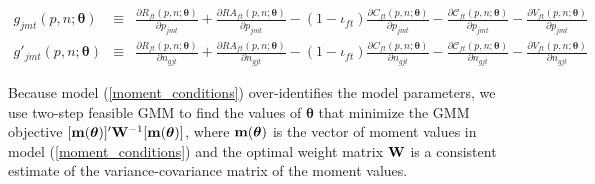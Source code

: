 \documentclass[12pt]{article}
\begin{document}
	\vspace{-0.4in}
	\begin{footnotesize}
	\begin{eqnarray*}
	g_{jmt}(\textit{p},\textit{n};\boldsymbol{\theta}) &\equiv& \frac{\partial R_{ft}(\textit{p},\textit{n};\boldsymbol{\theta})}{\partial p_{jmt}} + \frac{\partial RA_{ft}(\textit{p},\textit{n};\boldsymbol{\theta})}{\partial p_{jmt}} - (1-\iota_{ft}) \frac{\partial C_{ft}(\textit{p},\textit{n};\boldsymbol{\theta})}{\partial p_{jmt}} - \frac{\partial \mathcal{C}_{ft}(\textit{p},\textit{n};\boldsymbol{\theta})}{\partial p_{jmt}} - \frac{\partial V_{ft}(\textit{p},\textit{n};\boldsymbol{\theta})}{\partial p_{jmt}} \\
	g'_{jmt}(\textit{p},\textit{n};\boldsymbol{\theta}) &\equiv& 	\frac{\partial R_{ft}(\textit{p},\textit{n};\boldsymbol{\theta})}{\partial n_{gjt}} + \frac{\partial RA_{ft}(\textit{p},\textit{n};\boldsymbol{\theta})}{\partial n_{gjt}} - (1-\iota_{ft}) \frac{\partial C_{ft}(\textit{p},\textit{n};\boldsymbol{\theta})}{\partial n_{gjt}} - \frac{\partial \mathcal{C}_{ft}(\textit{p},\textit{n};\boldsymbol{\theta})}{\partial n_{gjt}} - \frac{\partial V_{ft}(\textit{p},\textit{n};\boldsymbol{\theta})}{\partial n_{gjt}}	
	\end{eqnarray*}
	\end{footnotesize}

	\vspace{-0.1in}  	
	
\noindent Because model (\ref{moment_conditions}) over-identifies the model parameters, we use two-step feasible GMM to find the values of $\boldsymbol{\theta}$ that minimize the GMM objective $[{\bf m}(\boldsymbol{\theta})]'{\bf W}^{-1}[{\bf m}(\boldsymbol{\theta})]$, where ${\bf m}(\boldsymbol{\theta})$ is the vector of moment values in model (\ref{moment_conditions}) and the optimal weight matrix ${\bf W}$ is a consistent estimate of the variance-covariance matrix of the moment values.  	
	
\end{document}
